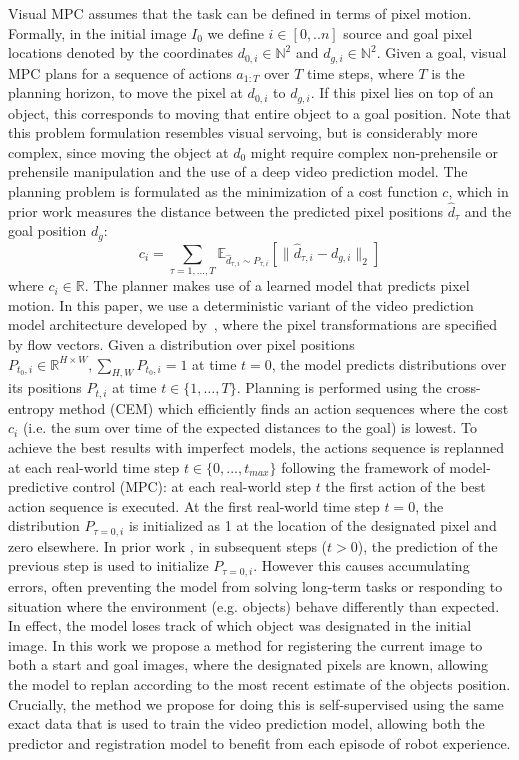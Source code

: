 Visual MPC assumes that the task can be defined in terms of pixel motion. Formally, in the initial image $I_0$ we define $i \in [0,..n]$ source and goal pixel locations denoted by the coordinates $d_{0,i} \in \mathbb{N}^2$ and $d_{g,i} \in \mathbb{N}^2$. Given a goal, visual MPC plans for a sequence of actions $a_{1:T}$ over $T$ time steps, where $T$ is the planning horizon, to move the pixel at $d_{0,i}$ to $d_{g,i}$. If this pixel lies on top of an object, this corresponds to moving that entire object to a goal position. Note that this problem formulation resembles visual servoing, but is considerably more complex, since moving the object at $d_0$ might require complex non-prehensile or prehensile manipulation and the use of a deep video prediction model.
The planning problem is formulated as the minimization of a cost function $c$, which in prior work \cite{sna} measures the distance between the predicted pixel positions $\hat{d}_{\tau}$ and the goal position $d_g$:
\begin{equation}
c_i  = \sum_{\tau = 1, \dots, T} \mathbb{E}_{\hat{d}_{\tau,i} \sim P_{\tau,i}} \left[\|\hat{d}_{\tau,i} - d_{g,i}\|_2\right]  
\label{eq:cost}
\end{equation}
where $c_i \in \mathbb{R}$. The planner makes use of a learned model that predicts pixel motion. In this paper, we use a deterministic variant of the video prediction model architecture developed by~\citet{savp}, where the pixel transformations are specified by flow vectors.
Given a distribution over pixel positions \mbox{$P_{t_0,i}\in\mathbb{R}^{H\times W}, \sum_{H,W} P_{t_0,i} = 1$} at time $t = 0$, the model predicts distributions over its positions $P_{t,i}$ at time $t \in \{ 1, \dots, T \}$. Planning is performed using the cross-entropy method (CEM) \cite{cem-rk-13} which efficiently finds an action sequences where the cost $c_i$ (i.e. the sum over time of the expected distances to the goal) is lowest.
To achieve the best results with imperfect models, the actions sequence is replanned at each real-world time step $t \in \{0,...,t_{max}\}$ following the framework of model-predictive control (MPC): at each real-world step $t$ the first action of the best action sequence is executed. 
At the first real-world time step $t=0$, the distribution $P_{\tau=0,i}$ is initialized as 1 at the location of the designated pixel and zero elsewhere. In prior work \cite{sna, foresight}, in subsequent steps ($t > 0$),  the prediction of the previous step is used to initialize $P_{\tau=0,i}$. However this causes accumulating errors, often preventing the model from solving long-term tasks or responding to situation where the environment (e.g. objects) behave differently than expected. In effect, the model loses track of which object was designated in the initial image. In this work we propose a method for registering the current image to both a start and goal images, where the designated pixels are known, allowing the model to replan according to the most recent estimate of the objects position. Crucially, the method we propose for doing this is self-supervised using the same exact data that is used to train the video prediction model, allowing both the predictor and registration model to benefit from each episode of robot experience.




